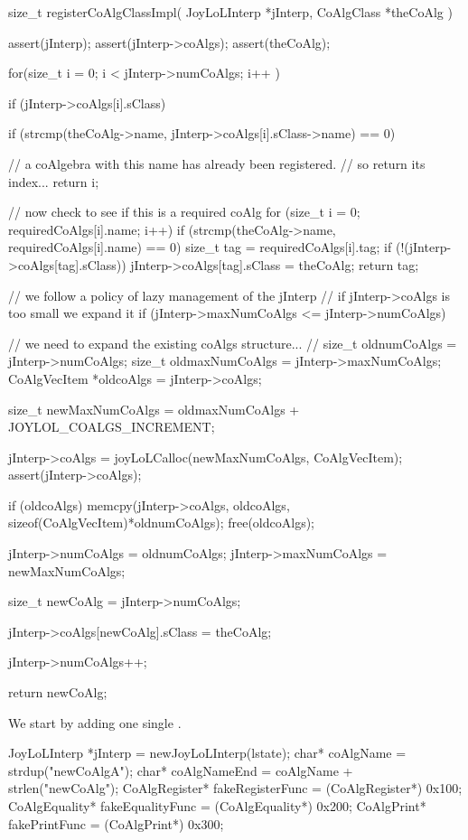 \startCCode
size_t registerCoAlgClassImpl(
  JoyLoLInterp *jInterp,
  CoAlgClass *theCoAlg
) {
  assert(jInterp);
  assert(jInterp->coAlgs);
  assert(theCoAlg);
  
  for(size_t i = 0; i < jInterp->numCoAlgs; i++ ) {
    if (jInterp->coAlgs[i].sClass) {
      if (strcmp(theCoAlg->name,
        jInterp->coAlgs[i].sClass->name) == 0) {
    
        // a coAlgebra with this name has already been registered. 
        // so return its index...
        return i;
      }
    }
  }

  // now check to see if this is a required coAlg
  for (size_t i = 0; requiredCoAlgs[i].name; i++) {
    if (strcmp(theCoAlg->name, requiredCoAlgs[i].name) == 0) {
      size_t tag = requiredCoAlgs[i].tag;
      if (!(jInterp->coAlgs[tag].sClass)) {
        jInterp->coAlgs[tag].sClass = theCoAlg;
      }
      return tag;
    }
  }

  // we follow a policy of lazy management of the jInterp
  // if jInterp->coAlgs is too small we expand it
  if (jInterp->maxNumCoAlgs <= jInterp->numCoAlgs) {
    // we need to expand the existing coAlgs structure...
    //  
    size_t oldnumCoAlgs     = jInterp->numCoAlgs;
    size_t oldmaxNumCoAlgs  = jInterp->maxNumCoAlgs;
    CoAlgVecItem *oldcoAlgs = jInterp->coAlgs;
    
    size_t newMaxNumCoAlgs =
      oldmaxNumCoAlgs + JOYLOL_COALGS_INCREMENT;

    jInterp->coAlgs =
      joyLoLCalloc(newMaxNumCoAlgs, CoAlgVecItem);
    assert(jInterp->coAlgs);
    
    if (oldcoAlgs) {
      memcpy(jInterp->coAlgs,
        oldcoAlgs,
        sizeof(CoAlgVecItem)*oldnumCoAlgs);
      free(oldcoAlgs);
    }
    
    jInterp->numCoAlgs    = oldnumCoAlgs;
    jInterp->maxNumCoAlgs = newMaxNumCoAlgs;
  }
  
  size_t newCoAlg = jInterp->numCoAlgs;
  
  jInterp->coAlgs[newCoAlg].sClass      = theCoAlg;
  
  jInterp->numCoAlgs++;
  
  return newCoAlg;
}
\stopCCode


We start by adding one single . 

\startCTest
  JoyLoLInterp *jInterp = newJoyLoLInterp(lstate);
  char*           coAlgName         = strdup("newCoAlgA");
  char*           coAlgNameEnd      = coAlgName + strlen("newCoAlg");
  CoAlgRegister*  fakeRegisterFunc  = (CoAlgRegister*)  0x100;
  CoAlgEquality*  fakeEqualityFunc  = (CoAlgEquality*)  0x200;
  CoAlgPrint*     fakePrintFunc     = (CoAlgPrint*)     0x300;
  
